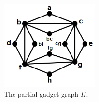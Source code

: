 \begin{figure}[htb]	
\center%
\includegraphics[width=5cm]{./img/gadgetBase.png}
\caption{The partial gadget graph $H$.}
\label{fig:gadgetBase}
\end{figure}